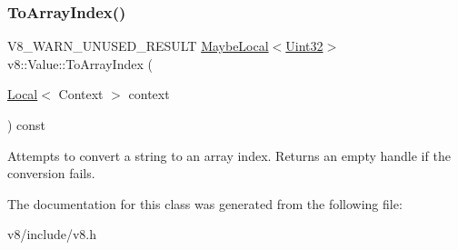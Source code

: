 \subsubsection{\texorpdfstring{To\+Array\+Index()}{ToArrayIndex()}}
{\footnotesize\ttfamily V8\+\_\+\+W\+A\+R\+N\+\_\+\+U\+N\+U\+S\+E\+D\+\_\+\+R\+E\+S\+U\+LT \mbox{\hyperlink{classv8_1_1MaybeLocal}{Maybe\+Local}}$<$\mbox{\hyperlink{classv8_1_1Uint32}{Uint32}}$>$ v8\+::\+Value\+::\+To\+Array\+Index (\begin{DoxyParamCaption}\item[{\mbox{\hyperlink{classv8_1_1Local}{Local}}$<$ Context $>$}]{context }\end{DoxyParamCaption}) const}

Attempts to convert a string to an array index. Returns an empty handle if the conversion fails. 

The documentation for this class was generated from the following file\+:\begin{DoxyCompactItemize}
\item 
v8/include/v8.\+h\end{DoxyCompactItemize}
